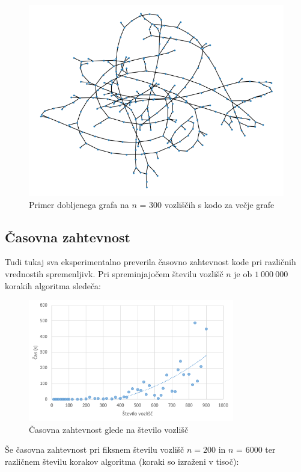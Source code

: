 \documentclass[a4paper, 12 pt]{article}
\begin{document}
\begin{figure}[H]
\centering
  \includegraphics[width=12cm]{drevo300diam202.png}
  \caption{Primer dobljenega grafa na $n$ = 300 vozliščih s kodo za večje grafe}
  \label{300_p2} 
\end{figure}

\subsection{Časovna zahtevnost}

Tudi tukaj sva eksperimentalno preverila časovno zahtevnost kode pri različnih vrednostih spremenljivk. Pri spreminjajočem številu vozlišč $n$ je ob $1 \ 000 \ 000$ korakih algoritma sledeča:

\begin{figure}[H]
\centering
  \includegraphics[width=9cm]{casovna_p2_n.png}
  \caption{Časovna zahtevnost glede na število vozlišč}
  \label{fig:p2_časovna_zaht_n} 
\end{figure}

\pagebreak

Še časovna zahtevnost pri fiksnem številu vozlišč $n = 200$ in $n$ = 6000 ter različnem številu korakov algoritma (koraki so izraženi v tisoč):
\end{document}
